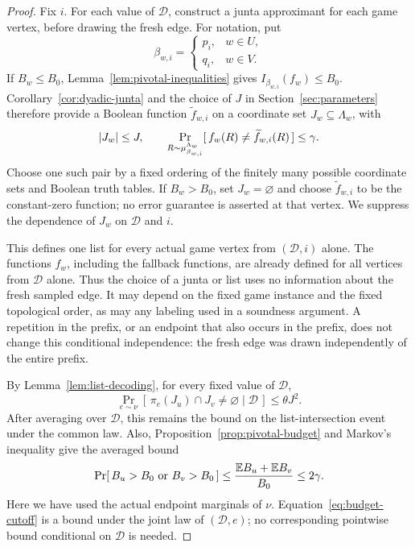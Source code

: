 \begin{proof}
Fix \(i\).  For each value of \(\mathcal D\), construct a junta
approximant for each game vertex, before drawing the fresh edge.
For notation, put
\[
  \beta_{w,i}=
  \begin{cases}
    p_i,&w\in U,\\
    q_i,&w\in V.
  \end{cases}
\]
If \(B_w\le B_0\), Lemma~\ref{lem:pivotal-inequalities} gives
\(I_{\beta_{w,i}}(f_w)\le B_0\).
Corollary~\ref{cor:dyadic-junta} and the choice of \(J\) in
Section~\ref{sec:parameters} therefore provide a Boolean function
\(\widetilde f_{w,i}\) on a coordinate set
\(J_w\subseteq\Lambda_w\), with
\begin{equation}
\label{eq:junta-error}
  \lvert J_w\rvert\le J,\qquad
  \Pr_{R\sim\mu_{\beta_{w,i}}^{\Lambda_w}}
    [\,f_w(R)\ne\widetilde f_{w,i}(R)\,]\le\gamma.
\end{equation}
Choose one such pair by a fixed ordering of the finitely many
possible coordinate sets and Boolean truth tables.
If \(B_w>B_0\), set \(J_w=\varnothing\) and choose
\(\widetilde f_{w,i}\) to be the constant-zero function; no error
guarantee is asserted at that vertex.
We suppress the dependence of \(J_w\) on \(\mathcal D\) and \(i\).

This defines one list for every actual game vertex from
\((\mathcal D,i)\) alone.  The functions \(f_w\), including the
fallback functions, are already defined for all vertices from
\(\mathcal D\) alone.  Thus the choice of a junta or list uses no
information about the fresh sampled edge.  It may depend on the
fixed game instance and the fixed topological order, as may any
labeling used in a soundness argument.  A repetition in the prefix,
or an endpoint that also occurs in the prefix, does not change this
conditional independence: the fresh edge was drawn independently
of the entire prefix.

By Lemma~\ref{lem:list-decoding}, for every fixed value of
\(\mathcal D\),
\[
  \Pr_{e\sim\nu}
     [\,\pi_e(J_u)\cap J_v\ne\varnothing
        \mid\mathcal D\,]\le\theta J^2.
\]
After averaging over \(\mathcal D\), this remains the bound on the
list-intersection event under the common law.
Also, Proposition~\ref{prop:pivotal-budget} and Markov's
inequality give the averaged bound
\begin{equation}
\label{eq:budget-cutoff}
  \Pr[\,B_u>B_0\ \text{or}\ B_v>B_0\,]
   \le\frac{\mathbb E B_u+\mathbb E B_v}{B_0}
   \le 2\gamma.
\end{equation}
Here we have used the actual endpoint marginals of \(\nu\).
Equation~\eqref{eq:budget-cutoff} is a bound under the joint law of
\((\mathcal D,e)\); no corresponding pointwise bound conditional
on \(\mathcal D\) is needed.


\end{proof}
